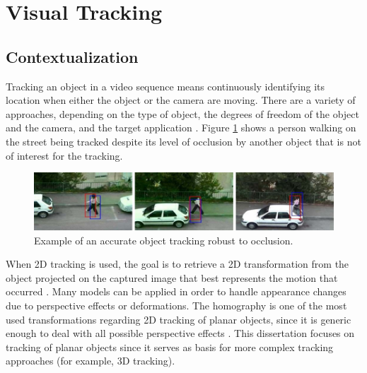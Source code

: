 


\section{Visual Tracking} %
\label{sec:basic_concepts:visual_tracking}

\subsection{Contextualization} %
\label{sub:basic_concepts:visual_tracking:contextualization}

Tracking an object in a video sequence means continuously identifying its location when either the object or the camera are moving. There are a variety of approaches, depending on the type of object, the degrees of freedom of the object and the camera, and the target application \cite{Lepetit2005,Teichrieb2007}. Figure \ref{figure:tracking_oclusion} shows a person walking on the street being tracked despite its level of occlusion by another object that is not of interest for the tracking.

\begin{figure}[!htb]
  \centering
  \includegraphics[width=\linewidth]{chapters/basic_concepts/tracking_oclusion.png}
  \caption{Example of an accurate object tracking robust to occlusion.}
  \label{figure:tracking_oclusion}
\end{figure}

When 2D tracking is used, the goal is to retrieve a 2D transformation from the object projected on the captured image that best represents the motion that occurred \cite{Li2008}. Many models can be applied in order to handle appearance changes due to perspective effects or deformations. The homography is one of the most used transformations regarding 2D tracking of planar objects, since it is generic enough to deal with all possible perspective effects \cite{CMei2008}. This dissertation focuses on tracking of planar objects since it serves as basis for more complex tracking approaches (for example, 3D tracking).

